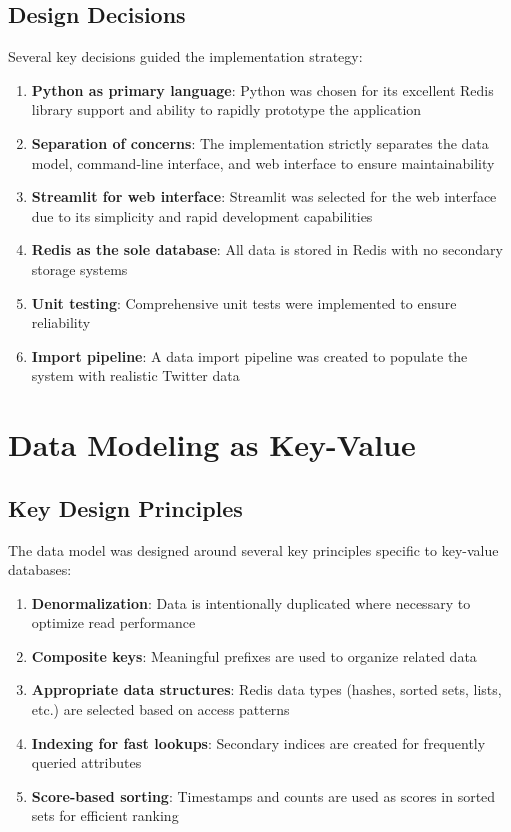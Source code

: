 \documentclass[a4paper,11pt]{article}
\begin{document}
\subsection{Design Decisions}
Several key decisions guided the implementation strategy:

\begin{enumerate}
    \item \textbf{Python as primary language}: Python was chosen for its excellent Redis library support and ability to rapidly prototype the application
    \item \textbf{Separation of concerns}: The implementation strictly separates the data model, command-line interface, and web interface to ensure maintainability
    \item \textbf{Streamlit for web interface}: Streamlit was selected for the web interface due to its simplicity and rapid development capabilities
    \item \textbf{Redis as the sole database}: All data is stored in Redis with no secondary storage systems
    \item \textbf{Unit testing}: Comprehensive unit tests were implemented to ensure reliability
    \item \textbf{Import pipeline}: A data import pipeline was created to populate the system with realistic Twitter data
\end{enumerate}

\newpage
\section{Data Modeling as Key-Value}

\subsection{Key Design Principles}
The data model was designed around several key principles specific to key-value databases:

\begin{enumerate}
    \item \textbf{Denormalization}: Data is intentionally duplicated where necessary to optimize read performance
    \item \textbf{Composite keys}: Meaningful prefixes are used to organize related data
    \item \textbf{Appropriate data structures}: Redis data types (hashes, sorted sets, lists, etc.) are selected based on access patterns
    \item \textbf{Indexing for fast lookups}: Secondary indices are created for frequently queried attributes
    \item \textbf{Score-based sorting}: Timestamps and counts are used as scores in sorted sets for efficient ranking
\end{enumerate}
\end{document}
